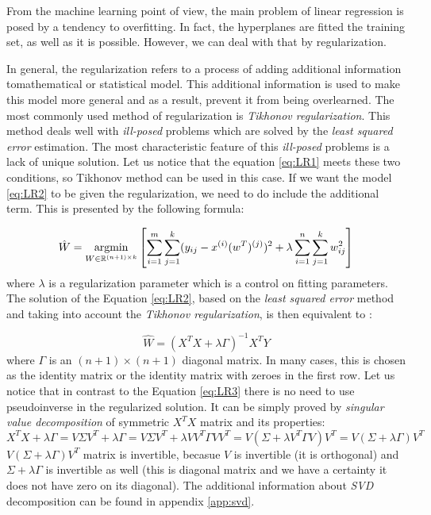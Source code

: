 From the machine learning point of view, the main problem of linear regression is posed by a tendency to overfitting. In fact, the hyperplanes are fitted the training set, as well as it is possible. However, we can deal with that by regularization.

In general, the regularization refers to a process of adding additional information tomathematical or statistical model. This additional information is used to make this model more general and as a result, prevent it from being overlearned. The most commonly used method of regularization is \textit{Tikhonov regularization}. This method deals well with \textit{ill-posed} problems which are solved by the \textit{least squared error} estimation. The most characteristic feature of this \textit{ill-posed} problems is a lack of unique solution. Let us notice that the equation \ref{eq:LR1} meets these two conditions, so Tikhonov method can be used in this case. If we want the model \ref{eq:LR2} to be given the regularization, we need to do include the additional term. This is presented by the following formula:

\begin{equation}\label{eq:LR2}
    \hat{W} = \operatorname*{argmin}_{W \in \mathbb{R}^{(n+1) \times k}}\left[\sum\limits_{i=1}^{m}\sum\limits_{j=1}^{k}(y_{ij}-x^{(i)}(w^T)^{(j)})^2 + \lambda\sum\limits_{i=1}^{n}\sum\limits_{j=1}^{k}w_{ij}^2\right]
\end{equation}
where $\lambda$ is a regularization parameter which is a control on fitting parameters. The solution of the Equation \ref{eq:LR2}, based on the \textit{least squared error} method and taking into account the \textit{Tikhonov regularization}, is then equivalent to \cite{Tikh}:

\begin{equation}\label{eq:LR3}
    \hat{W} = (X^TX+\lambda\Gamma)^{-1}X^TY
\end{equation}
where $\Gamma$ is an $(n+1)\times(n+1)$ diagonal matrix. In many cases, this is chosen as the identity matrix or the identity matrix with zeroes in the first row. Let us notice that in contrast to the Equation \ref{eq:LR3} there is no need to use pseudoinverse in the regularized solution. It can be simply proved by \textit{singular value decomposition} of symmetric $X^TX$ matrix and its properties:
\begin{equation}\label{eq:inv_proof}
    X^TX + \lambda\Gamma=V\Sigma{V^T} + \lambda\Gamma = V\Sigma{V^T} + \lambda{V}V^T\Gamma{V}V^T = V(\Sigma + \lambda{V^T}\Gamma{V})V^T = V(\Sigma + \lambda\Gamma)V^T 
\end{equation}
$V(\Sigma + \lambda\Gamma)V^T$ matrix is invertible, becasue $V$ is invertible (it is orthogonal) and $\Sigma +\lambda\Gamma$ is invertible as well (this is diagonal matrix and we have a certainty it does not have zero on its diagonal). The additional information about \textit{SVD} decomposition can be found in appendix \ref{app:svd}.

